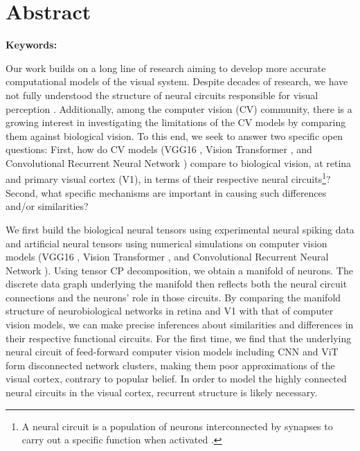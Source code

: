 \documentclass[
hidelinks,
12pt, %
oneside, %
english, %
doublespacing, %
headsepline, %
chapterinoneline, %
]{MastersDoctoralThesis} %
\author{\textsc{Zhang} Liu} %
\begin{document}
\frontmatter

\pagestyle{plain} 

\begin{titlepage}

\end{titlepage}

\chapter{Abstract}
\textbf{Keywords: \keywordnames}

Our work builds on a long line of research aiming to develop more accurate computational models of the visual system. Despite decades of research, we have not fully understood the structure of neural circuits responsible for visual perception \cite{Gwilliams221630}. Additionally, among the computer vision (CV) community, there is a growing interest in investigating the limitations of the CV models by comparing them against biological vision. To this end, we seek to answer two specific open questions: First, how do CV models (VGG16 \cite{vgg16_simonyan_very_2015}, Vision Transformer \cite{vit_dosovitskiy_image_2021}, and Convolutional Recurrent Neural Network \cite{convrnn_shi_end--end_2015}) compare to biological vision, at retina and primary visual cortex (V1), in terms of their respective neural circuits\footnote{A neural circuit is a population of neurons interconnected by synapses to carry out a specific function when activated \cite{gerhard_neuroscience_2013}.}? Second, what specific mechanisms are important in causing such differences and/or similarities?

We first build the biological neural tensors using experimental neural spiking data and artificial neural tensors using numerical simulations on computer vision models (VGG16 \cite{vgg16_simonyan_very_2015}, Vision Transformer \cite{vit_dosovitskiy_image_2021}, and Convolutional Recurrent Neural Network \cite{convrnn_shi_end--end_2015}).
Using tensor CP decomposition, we obtain a manifold of neurons. The discrete data graph underlying the manifold then reflects both the neural circuit connections and the neurons' role in those circuits. By comparing the manifold structure of neurobiological networks in retina and V1 with that of computer vision models, we can make precise inferences about similarities and differences in their respective functional circuits. For the first time, we find that the underlying neural circuit of feed-forward computer vision models including CNN and ViT form disconnected network clusters, making them poor approximations of the visual cortex, contrary to popular belief. In order to model the highly connected neural circuits in the visual cortex, recurrent structure is likely necessary.
\end{document}
